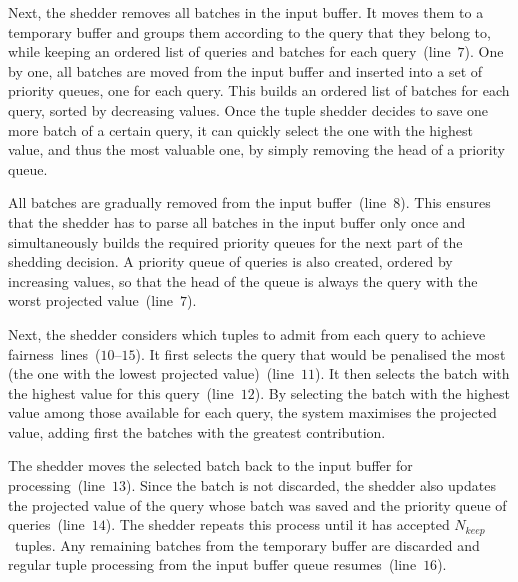 Next, the shedder removes all batches in the input buffer. It moves them to a temporary 
buffer and groups them according to the query that they belong to, while keeping an ordered list of
queries and batches for each query~(line~$7$).
One by one, all batches are moved from the input buffer and inserted into a set of priority
queues, one for each query. This builds an ordered list of batches for each query, sorted by decreasing
\sic values. Once the tuple shedder decides to save one more batch of a certain
query, it can quickly select the one with the highest \sic value, and thus the most valuable one, by
simply removing the head of a priority queue.

All batches are gradually removed from the input buffer~(line~$8$). 
This ensures that the shedder has to parse all batches in the input buffer only once 
and simultaneously builds the required priority queues for the next part of the shedding decision. 
A priority queue of queries is also created, ordered by increasing \sic values, so that the head of the
queue is always the query with the worst projected \sic value~(line~$7$).

Next, the shedder considers which tuples to admit from each query to achieve fairness~lines~($10$--$15$). 
It first selects the query that would be penalised the most (\ie the one with the
lowest projected \sic value)~(line~$11$). It then selects the
batch with the highest \sic value for this query~(line~$12$).
By selecting the batch with the highest \sic value among those available for each query, the
system maximises the projected \sic value, adding first the batches with the greatest contribution.

The shedder moves the selected batch back to the input buffer for processing~(line~$13$). 
Since the batch is not discarded, the shedder also updates the projected \sic value of the query
whose batch was saved and the priority queue of queries~(line~$14$).
The shedder repeats this process until it has accepted $N_{keep}$~tuples.
Any remaining batches from the temporary buffer are discarded and regular tuple processing
from the input buffer queue resumes~(line~$16$). 
 
% 
% 

